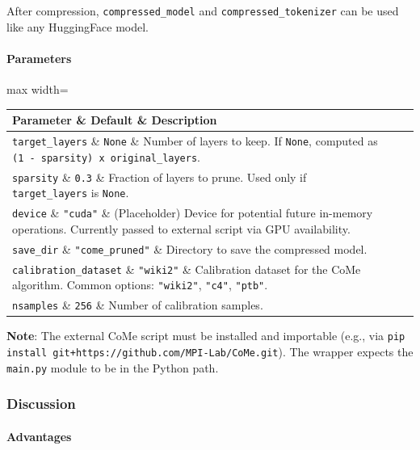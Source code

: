 After compression, \texttt{compressed\_model} and \texttt{compressed\_tokenizer} can be used like any HuggingFace model.

\paragraph{Parameters}

\begin{center}
\begin{adjustbox}{max width=\columnwidth}
\renewcommand{\arraystretch}{1.2}
\begin{tabular}{lll}
\toprule
Parameter \& Default \& Description \\
\midrule
\texttt{target\_layers} \& \texttt{None} \& Number of layers to keep. If \texttt{None}, computed as \texttt{(1 - sparsity) x original\_layers}. \\
\texttt{sparsity} \& \texttt{0.3} \& Fraction of layers to prune. Used only if \texttt{target\_layers} is \texttt{None}. \\
\texttt{device} \& \texttt{"cuda"} \& (Placeholder) Device for potential future in-memory operations. Currently passed to external script via GPU availability. \\
\texttt{save\_dir} \& \texttt{"come\_pruned"} \& Directory to save the compressed model. \\
\texttt{calibration\_dataset} \& \texttt{"wiki2"} \& Calibration dataset for the CoMe algorithm. Common options: \texttt{"wiki2"}, \texttt{"c4"}, \texttt{"ptb"}. \\
\texttt{nsamples} \& \texttt{256} \& Number of calibration samples. \\

\bottomrule
\end{tabular}
\end{adjustbox}
\end{center}
\textbf{Note}: The external CoMe script must be installed and importable (e.g., via \texttt{pip install git+https://github.com/MPI-Lab/CoMe.git}). The wrapper expects the \texttt{main.py} module to be in the Python path.


\subsubsection*{Discussion}

\paragraph{Advantages}

